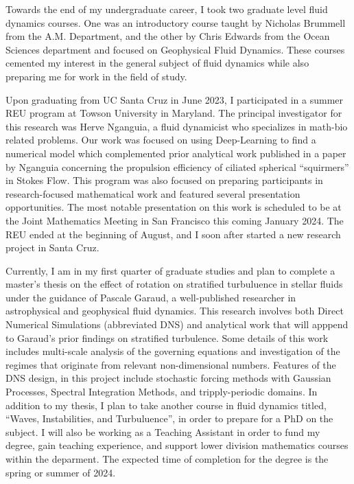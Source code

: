 \documentclass{article}
\begin{document}
Towards the end of my undergraduate career, I took two graduate level fluid dynamics courses. One was an introductory course taught by Nicholas Brummell from the A.M. Department, and the other by Chris Edwards from the Ocean Sciences department and focused on Geophysical Fluid Dynamics. These courses cemented my interest in the general subject of fluid dynamics while also preparing me for work in the field of study. 

Upon graduating from UC Santa Cruz in June 2023, I participated in a summer REU program at Towson University in Maryland. The principal investigator for this research was Herve Nganguia, a fluid dynamicist who specializes in math-bio related problems. Our work was focused on using Deep-Learning to find a numerical model which complemented prior analytical work published in a paper by Nganguia concerning the propulsion efficiency of ciliated spherical ``squirmers'' in Stokes Flow. This program was also focused on preparing participants in research-focused mathematical work and featured several presentation opportunities. The most notable presentation on this work is scheduled to be at the Joint Mathematics Meeting in San Francisco this coming January 2024. The REU ended at the beginning of August, and I soon after started a new research project in Santa Cruz. 

Currently, I am in my first quarter of graduate studies and plan to complete a master's thesis on the effect of rotation on stratified turbuluence in stellar fluids under the guidance of Pascale Garaud, a well-published researcher in astrophysical and geophysical fluid dynamics. This research involves both Direct Numerical Simulations (abbreviated DNS) and analytical work that will apppend to Garaud's prior findings on stratified turbulence. Some details of this work includes multi-scale analysis of the governing equations and investigation of the regimes that originate from relevant non-dimensional numbers. Features of the DNS design, in this project include stochastic forcing methods with Gaussian Processes, Spectral Integration Methods, and tripply-periodic domains. In addition to my thesis, I plan to take another course in fluid dynamics titled, ``Waves, Instabilities, and Turbuluence'', in order to prepare for a PhD on the subject. I will also be working as a Teaching Assistant in order to fund my degree, gain teaching experience, and support lower division mathematics courses within the deparment. The expected time of completion for the degree is the spring or summer of 2024. 
\end{document}
